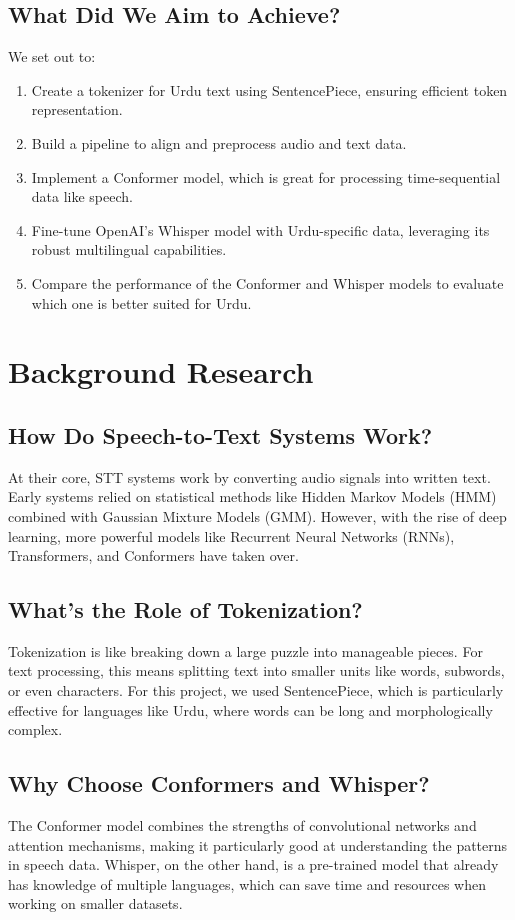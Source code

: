 \documentclass[12pt,a4paper]{report}
\begin{document}
\section{What Did We Aim to Achieve?}
We set out to:
\begin{enumerate}
    \item Create a tokenizer for Urdu text using SentencePiece, ensuring efficient token representation.
    \item Build a pipeline to align and preprocess audio and text data.
    \item Implement a Conformer model, which is great for processing time-sequential data like speech.
    \item Fine-tune OpenAI’s Whisper model with Urdu-specific data, leveraging its robust multilingual capabilities.
    \item Compare the performance of the Conformer and Whisper models to evaluate which one is better suited for Urdu.
\end{enumerate}

\chapter{Background Research}
\section{How Do Speech-to-Text Systems Work?}
At their core, STT systems work by converting audio signals into written text. Early systems relied on statistical methods like Hidden Markov Models (HMM) combined with Gaussian Mixture Models (GMM). However, with the rise of deep learning, more powerful models like Recurrent Neural Networks (RNNs), Transformers, and Conformers have taken over. 

\section{What’s the Role of Tokenization?}
Tokenization is like breaking down a large puzzle into manageable pieces. For text processing, this means splitting text into smaller units like words, subwords, or even characters. For this project, we used SentencePiece, which is particularly effective for languages like Urdu, where words can be long and morphologically complex.

\section{Why Choose Conformers and Whisper?}
The Conformer model combines the strengths of convolutional networks and attention mechanisms, making it particularly good at understanding the patterns in speech data. Whisper, on the other hand, is a pre-trained model that already has knowledge of multiple languages, which can save time and resources when working on smaller datasets.
\end{document}
